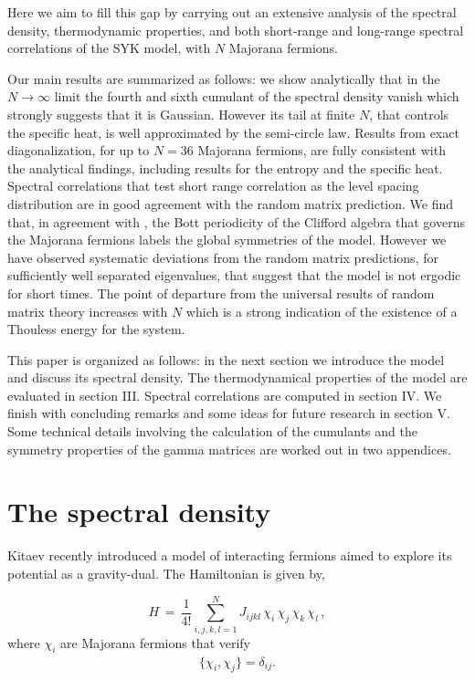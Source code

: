 \documentclass[aps,showpacs,floatfix,superscriptaddress,pre,11pt]{revtex4-1}
\begin{document}
Here we aim to fill this gap by carrying out an extensive analysis of the spectral density, thermodynamic properties, and both short-range and long-range spectral correlations of the SYK model, with $N$ Majorana fermions.

Our main results are summarized as follows: we show analytically that in the $N \to \infty$ limit the fourth and sixth cumulant of the spectral density vanish which strongly suggests that it is Gaussian. However its tail at finite $N$, that controls the specific heat, is well approximated by the semi-circle law.
Results from exact diagonalization, for up to $N=36$ Majorana fermions, are fully consistent with the analytical findings, including results for the
entropy and the specific heat.
Spectral correlations that test short range correlation as the level spacing distribution are in good agreement with the random matrix prediction. We find that, in agreement with \cite{you2016}, the Bott periodicity of the Clifford algebra that governs the Majorana fermions labels the global symmetries of the model. However we have observed systematic deviations from the random matrix predictions, for sufficiently well separated eigenvalues, that suggest that the model is not ergodic for short times. The point of departure from the universal results of random matrix theory increases with $N$ which is a strong indication of the existence of a Thouless energy \cite{altshuler1988,braun1995,bertrand2016} for the system.

This paper is organized as follows: in the next section
we  introduce the model and discuss its spectral density. The thermodynamical
properties of the model are evaluated in section III. Spectral
correlations are computed in section IV. We finish with concluding
remarks and some ideas for future research in section V. Some technical details involving the calculation
of the cumulants and the symmetry properties of the gamma matrices
are worked out in two appendices.
 
\section{The spectral density}
 
Kitaev recently introduced \cite{kitaev2015} a model of interacting fermions aimed to explore its potential as a gravity-dual. The Hamiltonian is given by,

 \begin{equation}\label{hami}
 H \, = \, \frac{1}{4!} \sum_{i,j,k,l=1}^N J_{ijkl} \, \chi_i \, \chi_j \, \chi_k \, \chi_l \, ,
 \end{equation}
 where $\chi_i$ are Majorana fermions that verify 
 \begin{eqnarray}
  \{ \chi_i, \chi_j \} = \delta_{ij}.\label{clif}
 \end{eqnarray}
\end{document}
